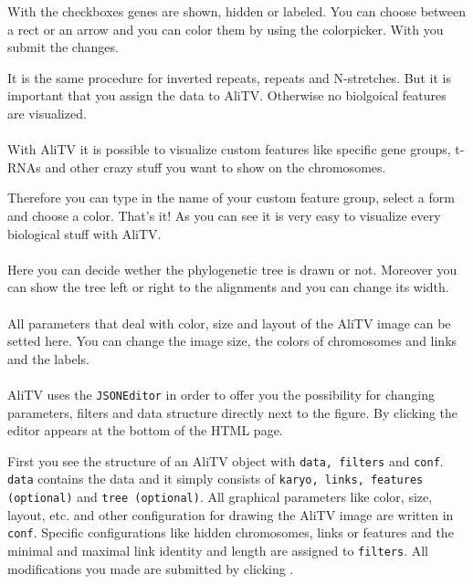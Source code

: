 \documentclass[a4paper]{scrartcl}
\begin{document}
With the checkboxes genes are shown, hidden or labeled. You can choose between a rect or an arrow and you can color them by using the colorpicker. With  you submit the changes.

It is the same procedure for inverted repeats, repeats and N-stretches. But it is important that you assign the data to AliTV. Otherwise no biolgoical features are visualized.

\paragraph*{}
With AliTV it is possible to visualize custom features like specific gene groups, t-RNAs and other crazy stuff you want to show on the chromosomes. 

Therefore you can type in the name of your custom feature group, select a form and choose a color. That's it! As you can see it is very easy to visualize every biological stuff with AliTV.

\paragraph*{}
Here you can decide wether the phylogenetic tree is drawn or not. Moreover you can show the tree left or right to the alignments and you can change its width.

\paragraph*{}
All parameters that deal with color, size and layout of the AliTV image can be setted here. You can change the image size, the colors of chromosomes and links and the labels.

\paragraph*{}
AliTV uses the \texttt{JSONEditor} in order to offer you the possibility for changing parameters, filters and data structure directly next to the figure. By clicking  the editor appears at the bottom of the HTML page. 

First you see the structure of an AliTV object with \texttt{data, filters} and \texttt{conf}. \texttt{data} contains the data and it simply consists of \texttt{karyo, links, features (optional)} and  \texttt{tree (optional)}. All graphical parameters like color, size, layout, etc. and other configuration for drawing the AliTV image are written in \texttt{conf}. Specific configurations like hidden chromosomes, links or features and the minimal and maximal link identity and length are assigned to \texttt{filters}. All modifications you made are submitted by clicking .
\end{document}
